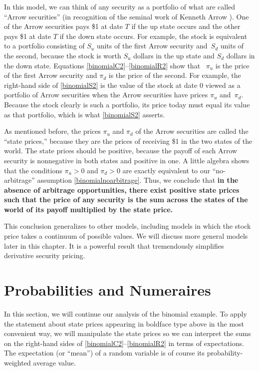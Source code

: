 In this model, we can think of any security as a portfolio of what are called ``Arrow securities'' (in recognition of the seminal work of Kenneth Arrow \cite{Arrow}).   One of the Arrow securities pays \$1 at date $T$ if the up state occurs and the other pays \$1 at date $T$ if the down state occurs.  For example, the stock is equivalent to a portfolio consisting of $S_u$ units of the first Arrow security and~$S_d$ units of the second, because the stock is worth $S_u$ dollars in the up state and $S_d$ dollars in the down state.  Equations \eqref{binomialC2}--\eqref{binomialR2} show that~ $\pi_u$ is the price of the first Arrow security and $\pi_d$ is the price of the second.  For example, the right-hand side of \eqref{binomialS2} is the value of the stock at date 0 viewed as a portfolio of Arrow securities when the Arrow securities have prices $\pi_u$ and~$\pi_d$.  Because the stock clearly is such a portfolio, its price today must equal its value as that portfolio, which is what \eqref{binomialS2} asserts.

As mentioned before, the prices $\pi_u$ and $\pi_d$ of the Arrow securities are called the ``state prices,'' because they are the prices of receiving \$1 in the two states of the world.  The state prices should be positive, because the payoff  of each Arrow security is nonnegative in both states and positive in one.  A little algebra shows that the conditions $\pi_u>0$ and $\pi_d>0$  are exactly equivalent to our ``no-arbitrage'' assumption \eqref{binomialnoarbitrage}.  Thus, we conclude that \textbf{in the absence of arbitrage opportunities, there exist positive state prices such that the price of any security is the sum across the states of the world of its payoff multiplied by the state price.}

This conclusion generalizes to other models, including models in which the stock price takes a continuum of possible values.  We will discuss more general models later in this chapter.  It is a powerful result that tremendously simplifies derivative security pricing.  

\section{Probabilities and Numeraires}

In this section, we will continue our analysis of the binomial example.  To apply the statement about state prices appearing in boldface type above in the most convenient way, we will manipulate the state prices  so we can interpret the sums on the right-hand sides of  \eqref{binomialC2}--\eqref{binomialR2} in terms of  expectations.   The expectation (or ``mean'') of a random variable is of course its probability-weighted average value.

